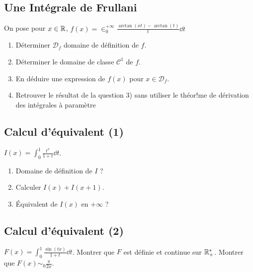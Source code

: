 \subsection{Une Intégrale de Frullani}
\begin{exo}
	On pose pour $x\in\mathbb{R}$, $f(x)=\in_0^{+\infty}\frac{\arctan(xt)-\arctan(t)}t\dd t$
	\begin{enumerate}
		\item Déterminer $\mathcal D_f$ domaine de définition de $f$.
		\item Déterminer le domaine de classe $\mathcal C^1$ de $f$.
		\item En déduire une expression de $f(x)$ pour $x\in\mathcal D_f$.
		\item Retrouver le résultat de la question 3) sans utiliser le théor!me de dérivation des intégrales à paramètre\\
	\end{enumerate}
\end{exo}

\begin{sol}
	[À rédiger]
\end{sol}

\subsection{Calcul d'équivalent (1)}
\begin{exo}
	$I(x)=\int_0^1\frac{t^x}{1+t}\dd t$.\\
	\begin{enumerate}
		\item Domaine de définition de $I$ ?
		\item Calculer $I(x) + I(x + 1)$.
		\item Équivalent de $I(x)$ en $+\infty$ ?
	\end{enumerate}
\end{exo}

\begin{sol}
	[À rédiger]
\end{sol}

\subsection{Calcul d'équivalent (2)}
\begin{exo}
	$F(x) = \int_0^1\frac{\sin(tx)}{1+t}\dd t$. Montrer que $F$ est définie et continue sur ${\mathbb{R}_+^*}$. Montrer que $F(x)\sim_0\frac\pi{2x}$.
\end{exo}

